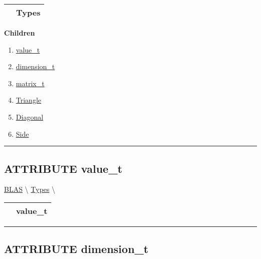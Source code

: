{\renewcommand{\arraystretch}{1.5}
\begin{tabularx}{\textwidth}{|>{\raggedright\arraybackslash}l|X|}
\hline
\hspace{0pt}\mytexttt{\color{red} } & \textbf{Types} \\
\hline
\end{tabularx}
}

\par


\textbf{Children}
\begin{enumerate}
\item \hyperlink{ecldoc:blas.types.value_t}{value\_t}
\item \hyperlink{ecldoc:blas.types.dimension_t}{dimension\_t}
\item \hyperlink{ecldoc:blas.types.matrix_t}{matrix\_t}
\item \hyperlink{ecldoc:ecldoc-Triangle}{Triangle}
\item \hyperlink{ecldoc:ecldoc-Diagonal}{Diagonal}
\item \hyperlink{ecldoc:ecldoc-Side}{Side}
\end{enumerate}

\rule{\linewidth}{0.5pt}

\subsection*{\textsf{\colorbox{headtoc}{\color{white} ATTRIBUTE}
value\_t}}

\hypertarget{ecldoc:blas.types.value_t}{}
\hspace{0pt} \hyperlink{ecldoc:blas}{BLAS} \textbackslash 
\hspace{0pt} \hyperlink{ecldoc:BLAS.Types}{Types} \textbackslash 

{\renewcommand{\arraystretch}{1.5}
\begin{tabularx}{\textwidth}{|>{\raggedright\arraybackslash}l|X|}
\hline
\hspace{0pt}\mytexttt{\color{red} } & \textbf{value\_t} \\
\hline
\end{tabularx}
}

\par


\rule{\linewidth}{0.5pt}
\subsection*{\textsf{\colorbox{headtoc}{\color{white} ATTRIBUTE}
dimension\_t}}

